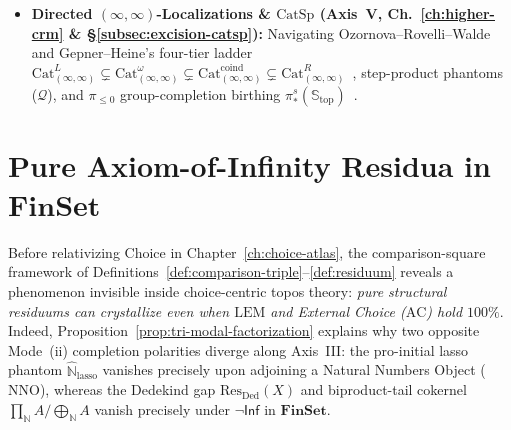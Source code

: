 \documentclass[10pt,twoside,openright]{book}
\theoremstyle{crmplain}
\theoremstyle{crmdef}
\theoremstyle{crmremark}
\newcommand{\lean}[1]{\ignorespaces}
\newcommand{\leanwitness}{\ignorespaces}
\begin{document}
\begin{itemize}[leftmargin=1.5em,noitemsep,topsep=2pt]
  \item \textbf{Directed $(\infty, \infty)$-Localizations \& $\mathrm{CatSp}$ (Axis~V, Ch.~\ref{ch:higher-crm} \& \S\ref{subsec:excision-catsp}):} Navigating Ozornova--Rovelli--Walde and Gepner--Heine's four-tier ladder $\mathrm{Cat}^L_{(\infty,\infty)} \subsetneq \mathrm{Cat}^\omega_{(\infty,\infty)} \subsetneq \mathrm{Cat}^{\mathrm{coind}}_{(\infty,\infty)} \subsetneq \mathrm{Cat}^R_{(\infty,\infty)}$~\cite{ORW26,GepnerHeine26}, step-product phantoms ($\mathcal{Q}$), and $\pi_{\le 0}$ group-completion birthing $\pi_*^s(\mathbb{S}_{\mathrm{top}})$~\cite{Heine26,Geiss26,BarrattPriddy72,Quillen71}.
\end{itemize}

\section{\texorpdfstring{Pure Axiom-of-Infinity Residua in $\mathbf{FinSet}$}{Pure Axiom-of-Infinity Residua in FinSet}}\label{sec:finset-infinity}%
\lean{HomotopyCRM.isEmpty_hom_of_fintype_to_succ_lasso, HomotopyCRM.profiniteLassoToZHat_surjective, HomotopyCRM.zHatToProfiniteLasso_neg_one_not_mem_range_nat, HomotopyCRM.dedekindResiduum_eq_empty_of_fintype, HomotopyCRM.nat_succ_mem_dedekindResiduum, HomotopyCRM.nominalDedekindResiduum_eq_empty, HomotopyCRM.not_hasFiniteSupportMap_nat_succ, HomotopyCRM.subsingleton_tailCokernel_of_fintype, HomotopyCRM.nontrivial_tailCokernel_nat, HomotopyCRM.chapter1_pure_infinity_residua_summary}%
\leanwitness%

Before relativizing Choice in Chapter~\ref{ch:choice-atlas}, the comparison-square framework of Definitions~\ref{def:comparison-triple}--\ref{def:residuum} reveals a phenomenon invisible inside choice-centric topos theory: \emph{pure structural residuums can crystallize even when $\mathrm{LEM}$ and External Choice ($\mathrm{AC}$) hold $100\%$}. Indeed, Proposition~\ref{prop:tri-modal-factorization} explains why two opposite Mode~(ii) completion polarities diverge along Axis~III: the pro-initial lasso phantom $\widehat{\mathbb{N}}_{\mathrm{lasso}}$ vanishes precisely upon adjoining a Natural Numbers Object ($\mathrm{NNO}$), whereas the Dedekind gap $\mathrm{Res}_{\mathrm{Ded}}(X)$ and biproduct-tail cokernel $\prod_{\mathbb{N}} A / \bigoplus_{\mathbb{N}} A$ vanish precisely under $\neg\mathsf{Inf}$ in $\mathbf{FinSet}$.
\end{document}
